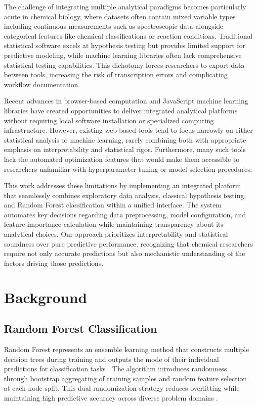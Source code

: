 \documentclass[conference]{IEEEtran}
\begin{document}
The challenge of integrating multiple analytical paradigms becomes particularly acute in chemical biology, where datasets often contain mixed variable types including continuous measurements such as spectroscopic data alongside categorical features like chemical classifications or reaction conditions. Traditional statistical software excels at hypothesis testing but provides limited support for predictive modeling, while machine learning libraries often lack comprehensive statistical testing capabilities. This dichotomy forces researchers to export data between tools, increasing the risk of transcription errors and complicating workflow documentation.

Recent advances in browser-based computation and JavaScript machine learning libraries have created opportunities to deliver integrated analytical platforms without requiring local software installation or specialized computing infrastructure. However, existing web-based tools tend to focus narrowly on either statistical analysis or machine learning, rarely combining both with appropriate emphasis on interpretability and statistical rigor. Furthermore, many such tools lack the automated optimization features that would make them accessible to researchers unfamiliar with hyperparameter tuning or model selection procedures.

This work addresses these limitations by implementing an integrated platform that seamlessly combines exploratory data analysis, classical hypothesis testing, and Random Forest classification within a unified interface. The system automates key decisions regarding data preprocessing, model configuration, and feature importance calculation while maintaining transparency about its analytical choices. Our approach prioritizes interpretability and statistical soundness over pure predictive performance, recognizing that chemical researchers require not only accurate predictions but also mechanistic understanding of the factors driving those predictions.

\section{Background}

\subsection{Random Forest Classification}

Random Forest represents an ensemble learning method that constructs multiple decision trees during training and outputs the mode of their individual predictions for classification tasks \cite{breiman2001random}. The algorithm introduces randomness through bootstrap aggregating of training samples and random feature selection at each node split. This dual randomization strategy reduces overfitting while maintaining high predictive accuracy across diverse problem domains \cite{hastie2009elements}.
\end{document}
